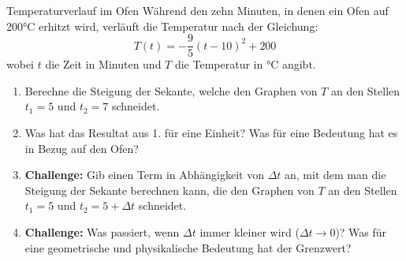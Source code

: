 \begin{LA}
    {Temperaturverlauf im Ofen}{}
    Während den zehn Minuten, in denen ein Ofen auf 200°C erhitzt wird, verläuft die Temperatur nach der Gleichung:
\[
    T(t) = -\frac{9}{5} (t-10)^2 + 200
\]
wobei $t$ die Zeit in Minuten und $T$ die Temperatur in °C angibt.

\begin{center}
\end{center}
\begin{enumerate}
    \item Berechne die Steigung der Sekante, welche den Graphen von $T$ an den Stellen $t_1=5$ und $t_2=7$ schneidet.
    \item Was hat das Resultat aus 1. für eine Einheit? Was für eine Bedeutung hat es in Bezug auf den Ofen?
    \item \textbf{Challenge:} Gib einen Term in Abhängigkeit von $\Delta t$ an, mit dem man die Steigung der Sekante berechnen kann, die den Graphen von $T$ an den Stellen $t_1=5$ und $t_2=5+\Delta t$ schneidet.
    \item \textbf{Challenge:} Was passiert, wenn $\Delta t$ immer kleiner wird ($\Delta t \to 0$)? Was für eine geometrische und physikalische Bedeutung hat der Grenzwert?
\end{enumerate}

\end{LA}



























